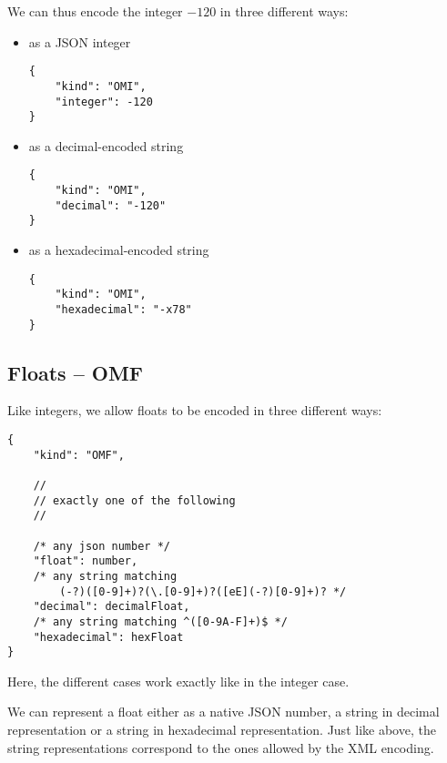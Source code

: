 We can thus encode the integer $-120$ in three different ways:
\begin{itemize}
    \item as a JSON integer
      \\\begin{minipage}{\linewidth}
\begin{lstlisting}
{
    "kind": "OMI",
    "integer": -120
}
\end{lstlisting}\end{minipage}
    \item as a decimal-encoded string
      \\\begin{minipage}{\linewidth}
\begin{lstlisting}
{
    "kind": "OMI",
    "decimal": "-120"
}
\end{lstlisting}\end{minipage}
    \item as a hexadecimal-encoded string
      \\\begin{minipage}{\linewidth}
\begin{lstlisting}
{
    "kind": "OMI",
    "hexadecimal": "-x78"
}
\end{lstlisting}\end{minipage}
\end{itemize}

\subsection{Floats -- OMF}

Like integers, we allow floats to be encoded in three different ways:
\\\begin{minipage}{\linewidth}
\begin{lstlisting}
{
    "kind": "OMF",

    //
    // exactly one of the following
    //

    /* any json number */
    "float": number,
    /* any string matching 
        (-?)([0-9]+)?(\.[0-9]+)?([eE](-?)[0-9]+)? */
    "decimal": decimalFloat,
    /* any string matching ^([0-9A-F]+)$ */
    "hexadecimal": hexFloat 
}
\end{lstlisting}\end{minipage}%

Here, the different cases work exactly like in the integer case. 

We can represent a float either as a native JSON number, a string in decimal representation or a string in hexadecimal representation. 
Just like above, the string representations correspond to the ones allowed by the XML encoding. 

